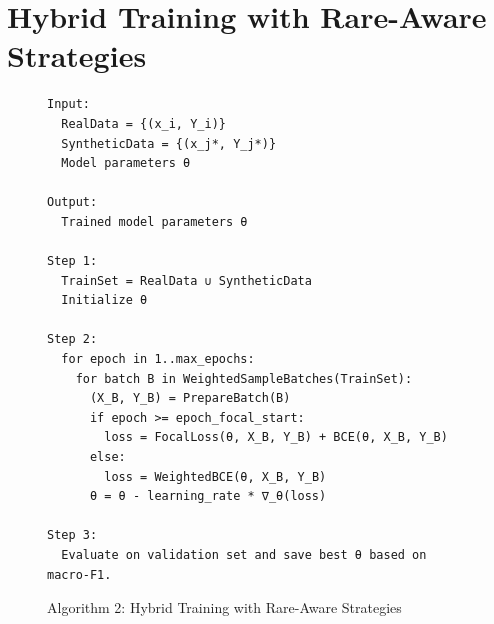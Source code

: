 \section{Hybrid Training with Rare-Aware Strategies}
\begin{figure}[H]
\centering
\caption{Algorithm 2: Hybrid Training with Rare-Aware Strategies}
\label{fig:algo2}
\begin{verbatim}
Input:
  RealData = {(x_i, Y_i)}
  SyntheticData = {(x_j*, Y_j*)}
  Model parameters θ

Output:
  Trained model parameters θ

Step 1:
  TrainSet = RealData ∪ SyntheticData
  Initialize θ

Step 2:
  for epoch in 1..max_epochs:
    for batch B in WeightedSampleBatches(TrainSet):
      (X_B, Y_B) = PrepareBatch(B)
      if epoch >= epoch_focal_start:
        loss = FocalLoss(θ, X_B, Y_B) + BCE(θ, X_B, Y_B)
      else:
        loss = WeightedBCE(θ, X_B, Y_B)
      θ = θ - learning_rate * ∇_θ(loss)

Step 3:
  Evaluate on validation set and save best θ based on macro-F1.
\end{verbatim}
\end{figure}